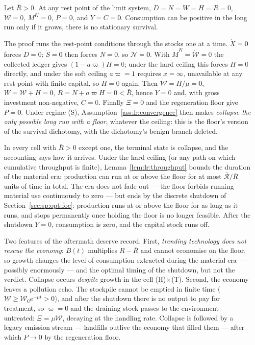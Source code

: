 \begin{proposition}\label{prop:lr:norest}
Let $\bar R>0$. At any rest point of the limit system, $D=N=W=H=R=0$, $\mathcal W=0$, $M^K=0$, $P=0$, and $Y=C=0$. Consumption can be positive in the long run only if it grows, there is no stationary survival.
\end{proposition}

The proof runs the rest-point conditions through the stocks one at a time. $\dot X=0$ forces $D=0$; $\dot S=0$ then forces $N=0$, so $\mathcal N=0$. With $\dot M^K=\dot{\mathcal W}=0$ the collected ledger gives $\left(1-a\varpi\right)H=0$; under the hard ceiling this forces $H=0$ directly, and under the soft ceiling $a\varpi=1$ requires $x=\infty$, unavailable at any rest point with finite capital, so $H=0$ again. Then $\mathcal W=H/\mu=0$, $W=\dot{\mathcal W}+H=0$, $R=N+a\varpi H=0<\bar R$, hence $Y=0$ and, with gross investment non-negative, $C=0$. Finally $\Xi=0$ and the regeneration floor give $P=0$. Under regime (S), Assumption~\ref{ass:lr:convergence} then makes \emph{collapse the only possible long run with a floor}, whatever the ceiling: this is the floor's version of the survival dichotomy, with the dichotomy's benign branch deleted.

 In every cell with $\bar R>0$ except one, the terminal state is collapse, and the accounting says how it arrives. Under the hard ceiling (or any path on which cumulative throughput is finite), Lemma~\ref{lem:lr:throughput} bounds the duration of the material era: production can run at or above the floor for at most $\bar{\mathcal R}/\bar R$ units of time in total. The era does not fade out --- the floor forbids running material use continuously to zero --- but ends by the discrete shutdown of Section~\ref{sec:sp:opt:foc}: production runs at or above the floor for as long as it runs, and stops permanently once holding the floor is no longer feasible. After the shutdown $Y=0$, consumption is zero, and the capital stock runs off.

Two features of the aftermath deserve record. First, \emph{trending technology does not rescue the economy}: $B\left(t\right)$ multiplies $R-\bar R$ and cannot economise on the floor, so growth changes the level of consumption extracted during the material era --- possibly enormously --- and the optimal timing of the shutdown, but not the verdict. Collapse occurs \emph{despite} growth in the cell (H)$\times$(T). Second, the economy leaves a pollution echo. The stockpile cannot be emptied in finite time ($\mathcal W\ge\mathcal W_0e^{-\mu t}>0$), and after the shutdown there is no output to pay for treatment, so $\varpi=0$ and the draining stock passes to the environment untreated: $\Xi=\mu\mathcal W$, decaying at the handling rate. Collapse is followed by a legacy emission stream --- landfills outlive the economy that filled them --- after which $P\to0$ by the regeneration floor.

